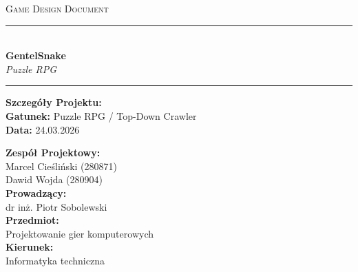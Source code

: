 \documentclass[12pt, letterpaper,Titlepage]{article}
\begin{document}
\begin{titlepage}
    
    \begin{center}
        \vspace*{3cm}
        {\scshape\Large Game Design Document \par} 
        \vspace{1cm}
        \rule{\textwidth}{1.2pt} \\[0.8cm] 
        {\fontsize{45pt}{55pt}\selectfont \textbf{GentelSnake}} \\[0.4cm]
        {\Large \textit{Puzzle RPG}} \\[0.6cm]
        \rule{\textwidth}{1.2pt}
    \end{center}

    \vfill 

    \begin{minipage}[t]{0.35\textwidth}
        \begin{flushleft}
            \large
            \textbf{Szczegóły Projektu:}\\[0.4cm]
            \textbf{Gatunek:} Puzzle RPG / Top-Down Crawler\\
            \textbf{Data:} 24.03.2026
        \end{flushleft}
    \end{minipage}
    \hfill
    \begin{minipage}[t]{0.50\textwidth}
        \begin{flushright}
            \large
            \textbf{Zespół Projektowy:}\\[0.4cm]
            Marcel Cieśliński (280871) \\
            Dawid Wojda (280904) \\[0.8cm]
            
            \textbf{Prowadzący:}\\
            dr inż. Piotr Sobolewski \\[0.2cm]
            \textbf{Przedmiot:}\\
            Projektowanie gier komputerowych \\[0.2cm]
            \textbf{Kierunek:}\\
            Informatyka techniczna
        \end{flushright}
    \end{minipage}

    \vspace*{1.5cm}
\end{titlepage}
\end{document}
